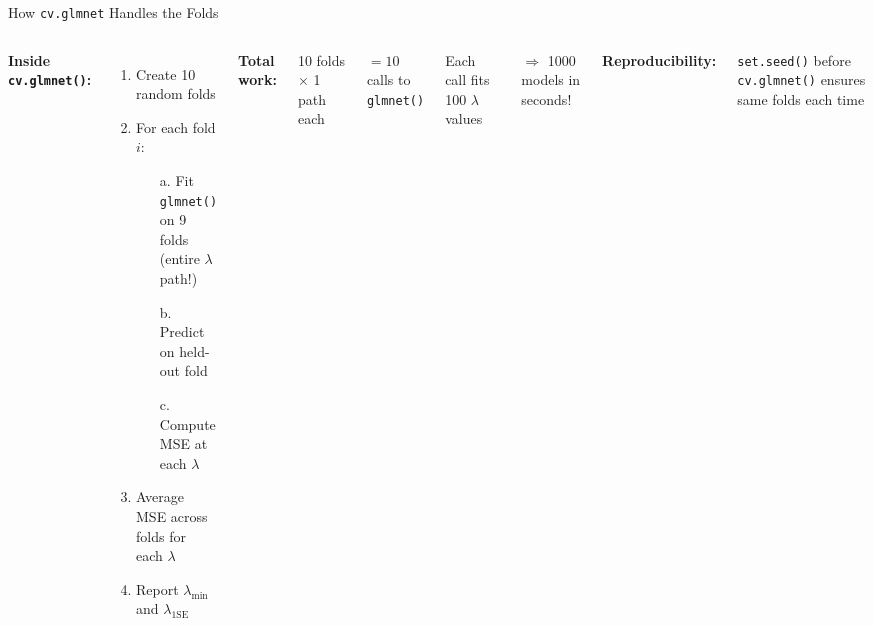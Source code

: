 \documentclass[aspectratio=169, 11pt]{beamer}
\begin{document}
\begin{frame}{How \texttt{cv.glmnet} Handles the Folds}
\begin{columns}
\textbf{Inside \texttt{cv.glmnet()}:}

\begin{enumerate}
  \item Create 10 random folds
  \item For each fold $i$:
  \begin{enumerate}
    \item[a.] Fit \texttt{glmnet()} on 9 folds\\(entire $\lambda$ path!)
    \item[b.] Predict on held-out fold
    \item[c.] Compute MSE at each $\lambda$
  \end{enumerate}
  \item Average MSE across folds for each $\lambda$
  \item Report $\lambda_{\min}$ and $\lambda_{\text{1SE}}$
\end{enumerate}

\textbf{Total work:}

10 folds $\times$ 1 path each

$= 10$ calls to \texttt{glmnet()}

Each call fits 100 $\lambda$ values

$\Rightarrow$ 1000 models in seconds!

\vspace{0.5em}
\textbf{Reproducibility:}

\texttt{set.seed()} before \texttt{cv.glmnet()} ensures same folds each time
\end{columns}
\end{frame}
\end{document}

